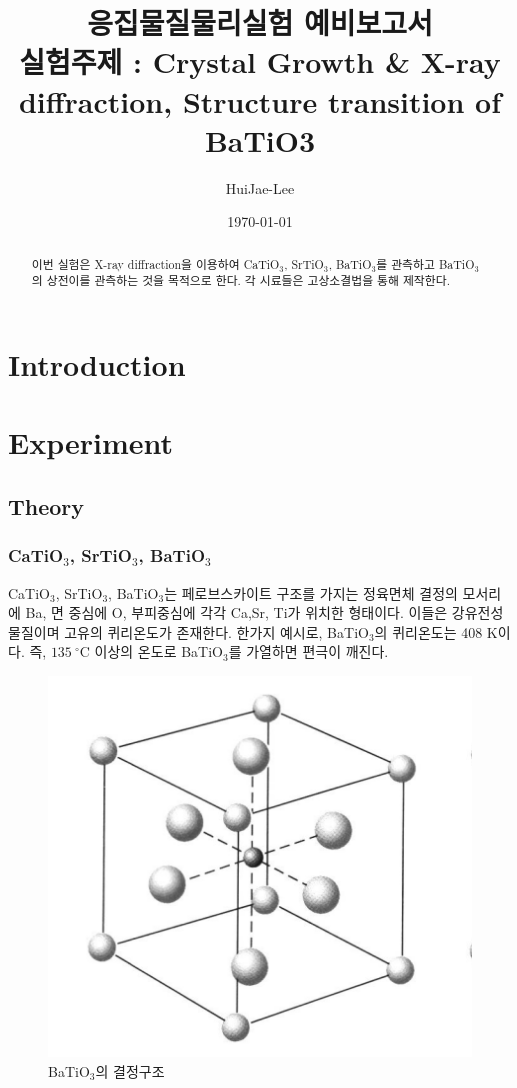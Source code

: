 \documentclass[aps,reprint,superscriptaddress,11pt]{revtex4-2}
\begin{document}
\title{응집물질물리실험 예비보고서 \\
\small 실험주제 : Crystal Growth \& X-ray diffraction,
Structure transition of BaTiO3}

\author{HuiJae-Lee}

\date{\today}


\begin{abstract}
이번 실험은 X-ray diffraction을 이용하여 CaTiO$_3$, SrTiO$_3$, BaTiO$_3$를 관측하고
BaTiO$_3$의 상전이를 관측하는 것을 목적으로 한다. 각 시료들은 고상소결법을 통해 제작한다.
 \end{abstract}
 
 \maketitle
 
 \section[Introduction]{Introduction}

\section[Experiment]{Experiment}
\subsection{Theory}
\subsubsection{CaTiO$_3$, SrTiO$_3$, BaTiO$_3$}

CaTiO$_3$, SrTiO$_3$, BaTiO$_3$는 페로브스카이트 구조를 가지는 정육면체 결정의 모서리에
Ba, 면 중심에 O, 부피중심에 각각 Ca,Sr, Ti가 위치한 형태이다. 이들은 강유전성 물질이며 
고유의 퀴리온도가 존재한다. 한가지 예시로, BaTiO$_3$의 
퀴리온도는 408 K이다. 즉, $135~\mathrm{^\circ C}$ 이상의 온도로 BaTiO$_3$를 가열하면
편극이 깨진다.

\begin{figure}[htbp]
  \centering
  \includegraphics[scale=0.3]{BaTiO.png}
  \caption{BaTiO$_3$의 결정구조}
  \label{fig:batio}
\end{figure}
\end{document}
